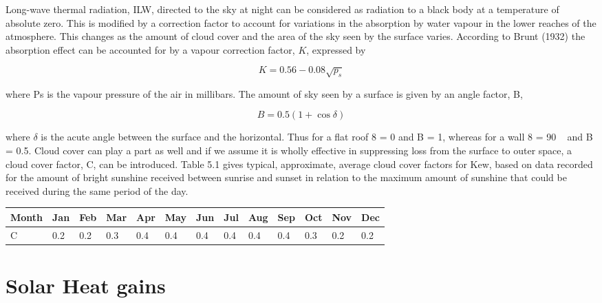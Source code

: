 Long-wave thermal radiation, ILW, directed to the sky at night can be considered as
radiation to a black body at a temperature of absolute zero. This is modified by a correction
factor to account for variations in the absorption by water vapour in the lower reaches of
the atmosphere. This changes as the amount of cloud cover and the area of the sky seen by
the surface varies. According to Brunt (1932) the absorption effect can be accounted for by
a vapour correction factor, $K$, expressed by

\begin{equation}
K = 0.56 - 0.08 \sqrt{p_s}
\end{equation}

where Ps is the vapour pressure of the air in millibars. The amount of sky seen by a surface
is given by an angle factor, B,

\begin{equation}
B = 0.5(1 + \cos \delta)
\end{equation}

where $\delta$  is the acute angle between the surface and the horizontal. Thus for a flat roof 8 =
0 and B = 1, whereas for a wall 8 = 90 ~ and B = 0.5. Cloud cover can play a part as well
and if we assume it is wholly effective in suppressing loss from the surface to outer space,
a cloud cover factor, C, can be introduced. Table 5.1 gives typical, approximate, average
cloud cover factors for Kew, based on data recorded for the amount of bright sunshine
received between sunrise and sunset in relation to the maximum amount of sunshine that
could be received during the same period of the day.

\begin{minipage}{5in}
\begin{tabular}{lllllllllllll}
\toprule
Month &Jan &Feb &Mar &Apr &May &Jun &Jul &Aug &Sep &Oct &Nov &Dec\\
\midrule
C &0.2 &0.2   &0.3   &0.4   &0.4  &0.4  &0.4  &0.4  &0.4  &0.3 &0.2 &0.2\\
\bottomrule
\end{tabular}
\end{minipage}
\def\badcheck{A penalty has been added because your
check to us was not honored by your bank.\par}
\def\cheater{A penalty of 50\% of the underpaid tax
has been added for fraud.\par}

\chapter{Solar Heat gains}

